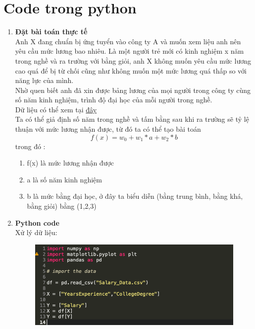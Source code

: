 \documentclass[12pt,letterpaper]{article}
\begin{document}
\section*{Code trong python}
\begin{enumerate}
    \item \textbf {Đặt bài toán thực tế}
    \\
    Anh X đang chuẩn bị ứng tuyển vào công ty A và muốn xem liệu anh nên yêu cầu mức lương bao nhiêu. Là một người trẻ mới có kinh nghiệm x năm trong nghề và ra trường với bằng giỏi, anh X không muốn yêu cầu mức lương cao quá để bị từ chối cũng như không muốn một mức lương quá thấp so với năng lực của mình. 
    \\
    Nhờ quen biết anh đã xin được bảng lương của mọi người trong công ty cùng số năm kinh nghiệm, trình độ đại học của mỗi người trong nghề.
    \\
    Dữ liệu có thể xem tại \href{https://github.com/LittleCuteBug/LinearReagression/blob/master/Salary_Data.csv}{đây}
    \\
    Ta có thể giả định số năm trong nghề và tấm bằng sau khi ra trường sẽ tỷ lệ thuận với mức lương nhận được, từ đó ta có thể tạo bài toán
    $$
        f(x) = w_0 + w_1 * a + w_2 * b
    $$
    trong đó :
    \begin{enumerate}
        \item f(x) là mức lương nhận được
        \item a là số năm kinh nghiệm
        \item b là mức bằng đại học, ở đây ta biểu diễn (bằng trung bình, bằng khá, bằng giỏi) bằng (1,2,3)
    \end{enumerate}
    \item \textbf {Python code}
    \\
    Xử lý dữ liệu:
    \begin{figure}[ht]
        \centering 
        \includegraphics[scale=0.5]{python1.png}
    \end{figure}
    \\

\end{enumerate}
\end{document}
